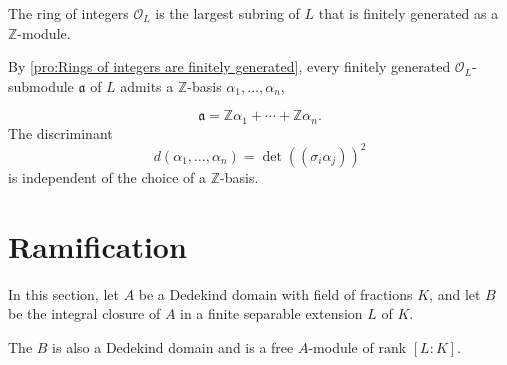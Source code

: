\documentclass[12pt, oneside]{book}
\begin{document}
\begin{corollary}
    The ring of integers $\mathcal{O}_L$ is the largest subring of $L$ that is finitely generated as a $\mathbb{Z}$-module.

    By \cref{pro:Rings of integers are finitely generated},  every finitely generated $\mathcal{O}_L$-submodule $\mathfrak{a}$ of $L$ admits a $\mathbb{Z}$-basis $\alpha_1, \ldots, \alpha_n$,

    \begin{equation*}
        \mathfrak{a}=\mathbb{Z} \alpha_1+\cdots+\mathbb{Z} \alpha_n .
    \end{equation*}
    The discriminant
    \begin{equation*}
        d\left(\alpha_1, \ldots, \alpha_n\right)=\operatorname{det}\left(\left(\sigma_i \alpha_j\right)\right)^2
    \end{equation*}
    is independent of the choice of a $\mathbb{Z}$-basis.
\end{corollary}





\section{Ramification}
In this section, let $A$ be a Dedekind domain with field of fractions $K$, and let $B$ be the integral closure of $A$ in a finite separable extension $L$ of $K$.
\begin{theorem}
    The $B$ is also a Dedekind domain and is a free $A$-module of rank $[L: K]$.
\end{theorem}
\end{document}
